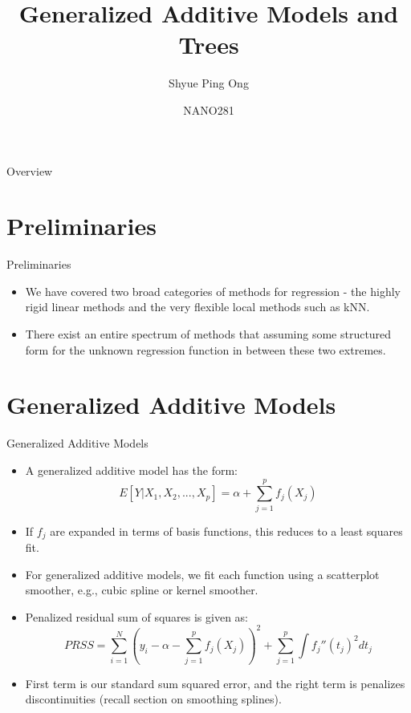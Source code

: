 \documentclass{beamer}
\title[Generalized Additive Models and Trees]{Generalized Additive Models and Trees}
\author{Shyue Ping Ong}
\institute[UCSD]{University of California, San Diego\\
\medskip
}
\date{NANO281} %
\begin{document}
\begin{frame}
    \titlepage %
\end{frame}


\begin{frame}{Overview}
    \tableofcontents
\end{frame}


\section{Preliminaries}

\begin{frame}{Preliminaries}
    \begin{itemize}
        \item We have covered two broad categories of methods for regression - the highly rigid linear methods and the very flexible local methods such as kNN. 
        \item There exist an entire spectrum of methods that assuming some structured form for the unknown regression function in between these two extremes.
    \end{itemize}
\end{frame}

\section{Generalized Additive Models}

\begin{frame}{Generalized Additive Models}
    \begin{itemize}
        \item A generalized additive model has the form:
        \begin{equation*}
            E[Y|X_1, X_2, ..., X_p] = \alpha + \sum_{j=1}^p f_j(X_j)
        \end{equation*}
        \item If $f_j$ are expanded in terms of basis functions, this reduces to a least squares fit. 
        \item For generalized additive models, we fit each function using a scatterplot smoother, e.g., cubic spline or kernel smoother.
        \item Penalized residual sum of squares is given as:
        \begin{equation*}
            PRSS = \sum_{i=1}^N \left( y_i - \alpha - \sum_{j=1}^p f_j(X_j) \right)^2 + \sum_{j=1}^p \int f_j''(t_j)^2 dt_j
        \end{equation*}
        \item First term is our standard sum squared error, and the right term is penalizes discontinuities (recall section on smoothing splines).
    \end{itemize}
\end{frame}
\end{document}
